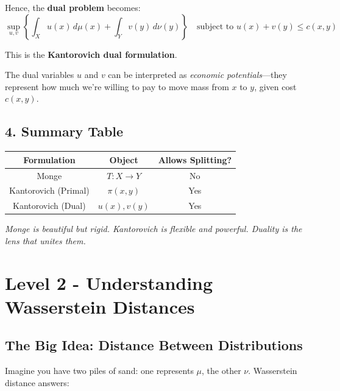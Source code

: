 \documentclass[11pt]{article}
\begin{document}
Hence, the \textbf{dual problem} becomes:
\[
\sup_{u, v} \left\{ \int_X u(x)\, d\mu(x) + \int_Y v(y)\, d\nu(y) \right\} \quad \text{subject to } u(x) + v(y) \leq c(x, y)
\]

This is the \textbf{Kantorovich dual formulation}.

\vspace{1em}
\begin{tcolorbox}[colback=blue!5!white, colframe=blue!75!black, title=Takeaway]
The dual variables $u$ and $v$ can be interpreted as \emph{economic potentials}---they represent how much we're willing to pay to move mass from $x$ to $y$, given cost $c(x, y)$.
\end{tcolorbox}




\subsection*{4. Summary Table}

\begin{center}
\begin{tabular}{|c|c|c|}
\hline
\textbf{Formulation} & \textbf{Object} & \textbf{Allows Splitting?} \\\hline
Monge & $T : X \to Y$ & No \\\hline
Kantorovich (Primal) & $\pi(x, y)$ & Yes \\\hline
Kantorovich (Dual) & $u(x), v(y)$ & Yes \\\hline
\end{tabular}
\end{center}

\vspace{1em}
\begin{center}
\textit{Monge is beautiful but rigid. Kantorovich is flexible and powerful. Duality is the lens that unites them.}
\end{center}

\newpage
{}
\section*{Level 2 - Understanding Wasserstein Distances}

\subsection*{The Big Idea: Distance Between Distributions}
Imagine you have two piles of sand: one represents $\mu$, the other $\nu$. Wasserstein distance answers:
\end{document}

